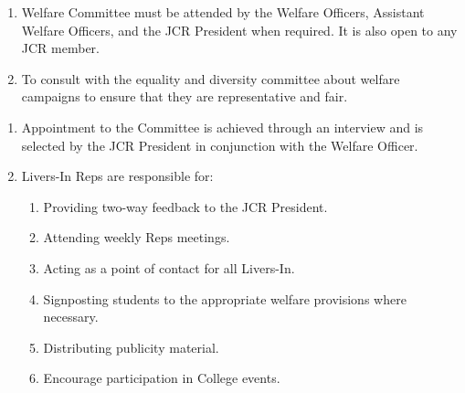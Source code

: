\begin{enumerate}
    \item Welfare Committee must be attended by the Welfare Officers, Assistant Welfare Officers, and the JCR President when required. It is also open to any JCR member.
    \item To consult with the equality and diversity committee about welfare campaigns to ensure that they are representative and fair.
\end{enumerate}


\begin{enumerate}
    \item Appointment to the Committee is achieved through an interview and is selected by the JCR President in conjunction with the Welfare Officer.
    \item Livers-In Reps are responsible for:
    \begin{enumerate}
        \item Providing two-way feedback to the JCR President.
        \item Attending weekly Reps meetings.
        \item Acting as a point of contact for all Livers-In.
        \item Signposting students to the appropriate welfare provisions where necessary. 
        \item Distributing publicity material.
        \item Encourage participation in College events.
    \end{enumerate}
\end{enumerate}



